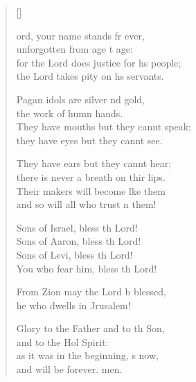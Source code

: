 \settowidth{\versewidth}{for the Lord does justice for his people; *}
\begin{verse}[\versewidth]
  \begin{patverse}
ord, your name stands fr ever,\Med\\
unforgotten from age t age:\\
for the Lord does justice for h\pointup{\i}s people;\Med\\
the Lord takes pity on h\pointup{\i}s servants.

Pagan idols are silver nd gold,\Med\\
the work of humn hands.\\
They have mouths but they cannt speak;\Med\\
they have eyes but they cannt see.

They have ears but they cannt hear;\Med\\
there is never a breath on thir lips.\\
Their makers will become l\pointup{\i}ke them\Med\\
and so will all who trust \pointup{\i}n them!

Sons of Israel, bless th Lord!\Med\\
Sons of Aaron, bless th Lord!\\
Sons of Levi, bless th Lord!\Med\\
You who fear him, bless th Lord!

From Zion may the Lord b blessed,\Med\\
he who dwells in Jrusalem!

Glory to the Father and to th Son,\Med\\
and to the Hol Spirit:\\
as it was in the beginning, \pointup{\i}s now,\Med\\
and will be forever. men.
  \end{patverse}
\end{verse}
